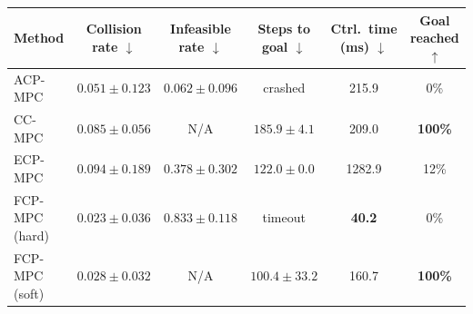 \begin{tabular}{lccccc}
\hline
Method &
Collision rate $\downarrow$ &
Infeasible rate $\downarrow$ &
Steps to goal $\downarrow$ &
Ctrl.\ time (ms) $\downarrow$ &
Goal reached $\uparrow$ \\
\hline
ACP-MPC~\cite{dixit2023adaptive}
& $0.051\pm0.123$
& \textbf{$0.062\pm0.096$}
& crashed
& 215.9
& 0\% \\
CC-MPC~\cite{lekeufack2024decision}
& $0.085\pm0.056$
& N/A
& $185.9\pm4.1$
& 209.0
& \textbf{100\%} \\
ECP-MPC~\cite{shin2025egocentric}
& $0.094\pm0.189$
& $0.378\pm0.302$
& $122.0\pm0.0$
& 1282.9
& 12\% \\
FCP-MPC (hard)
& \textbf{$0.023\pm0.036$}
& $0.833\pm0.118$
& timeout
& \textbf{40.2}
& 0\% \\
FCP-MPC (soft)
& $0.028\pm0.032$
& N/A
& \textbf{$100.4\pm33.2$}
& 160.7
& \textbf{100\%} \\
\hline
\end{tabular}
